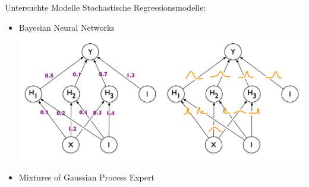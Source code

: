 \documentclass[18pt]{beamer}
\begin{document}
\begin{frame}{Untersuchte Modelle}
  Stochastische Regressionsmodelle:
  \begin{itemize}
  \item Bayesian Neural Networks
    \includegraphics[scale=0.35]{images/bnn}
  \item Mixtures of Gaussian Process Expert
  \end{itemize}
\end{frame}
\end{document}
